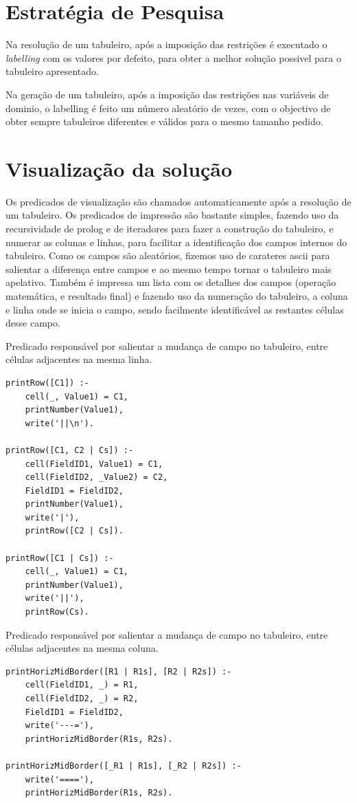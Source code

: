 \documentclass[runningheads,a4paper]{llncs}
\begin{document}
\newpage
\section{Estratégia de Pesquisa}
Na resolução de um tabuleiro, após a imposição das restrições é executado o \emph{labelling} com os valores por defeito, para obter a melhor solução possivel para o tabuleiro apresentado.

Na geração de um tabuleiro, após a imposição das restrições nas variáveis de dominio, o labelling é feito um número aleatório de vezes, com o objectivo de obter sempre tabuleiros diferentes e válidos para o mesmo tamanho pedido.

\section{Visualização da solução}
Os predicados de visualização são chamados automaticamente após a resolução de um tabuleiro.
Os predicados de impressão são bastante simples, fazendo uso da recursividade de prolog e de iteradores para fazer a construção do tabuleiro, e numerar as colunas e linhas, para facilitar a identificação dos campos internos do tabuleiro.
Como os campos são aleatórios, fizemos uso de carateres ascii para salientar a diferença entre campos e ao mesmo tempo tornar o tabuleiro mais apelativo. Também é impressa um lista com os detalhes dos campos (operação matemática, e resultado final) e fazendo uso da numeração do tabuleiro, a coluna e linha onde se inicia o campo, sendo facilmente identificável as restantes células desse campo.

Predicado responsável por salientar a mudança de campo no tabuleiro, entre células adjacentes na mesma linha.
\begin{verbatim}
printRow([C1]) :- 
	cell(_, Value1) = C1,  
	printNumber(Value1),
	write('||\n').

printRow([C1, C2 | Cs]) :- 
	cell(FieldID1, Value1) = C1, 
	cell(FieldID2, _Value2) = C2, 
	FieldID1 = FieldID2, 
	printNumber(Value1),
	write('|'), 
	printRow([C2 | Cs]).

printRow([C1 | Cs]) :- 
	cell(_, Value1) = C1,
	printNumber(Value1),
	write('||'), 
	printRow(Cs).
\end{verbatim}

Predicado responsável por salientar a mudança de campo no tabuleiro, entre células adjacentes na mesma coluna.
\begin{verbatim}
printHorizMidBorder([R1 | R1s], [R2 | R2s]) :- 
	cell(FieldID1, _) = R1, 
	cell(FieldID2, _) = R2, 
	FieldID1 = FieldID2, 
	write('---='), 
	printHorizMidBorder(R1s, R2s). 

printHorizMidBorder([_R1 | R1s], [_R2 | R2s]) :- 
	write('===='), 
	printHorizMidBorder(R1s, R2s).
\end{verbatim}
\end{document}
